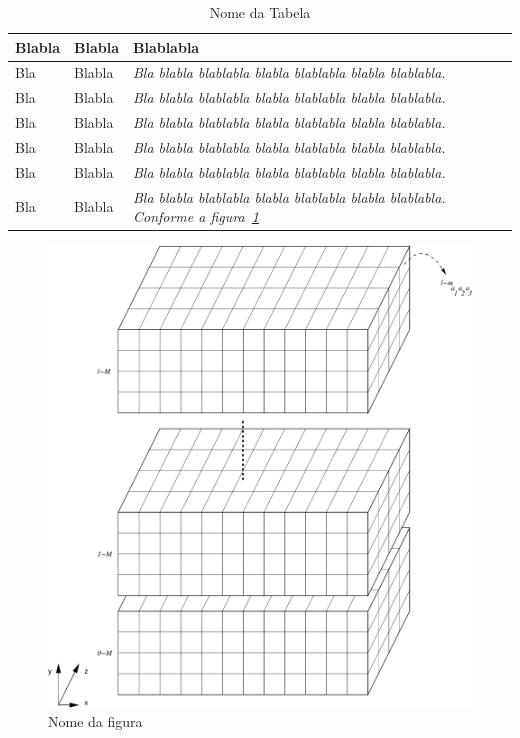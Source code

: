 \documentclass[tese,capa]{texufpel}
\begin{document}
\begin{table}
\begin{center}
\caption{Nome da Tabela}\label{tabela2}
\begin{tabular}{p{4cm}p{5cm}p{6cm}}
\hline
Blabla & Blabla & Blablabla\\
\hline
{\small Bla} & {\small Blabla} & {\small\em Bla blabla blablabla blabla
  blablabla blabla blablabla.}\\
{\small Bla} & {\small Blabla} & {\small\em Bla blabla blablabla blabla
  blablabla blabla blablabla.}\\
{\small Bla} & {\small Blabla} & {\small\em Bla blabla blablabla blabla
  blablabla blabla blablabla.}\\
{\small Bla} & {\small Blabla} & {\small\em Bla blabla blablabla blabla
  blablabla blabla blablabla.}\\
{\small Bla} & {\small Blabla} & {\small\em Bla blabla blablabla blabla
  blablabla blabla blablabla.}\\
{\small Bla} & {\small Blabla} & {\small\em Bla blabla blablabla blabla
  blablabla blabla blablabla. Conforme a figura~\ref{figura}}\\
\hline
\end{tabular}
\end{center}
\end{table}

\begin{figure}[htbp]
  \centering \includegraphics[scale=.4]{figura}
\caption{Nome da figura} 
\label{figura}
\end{figure}
\end{document}
